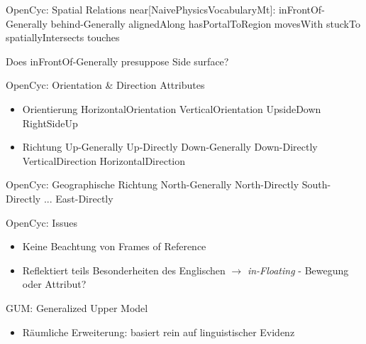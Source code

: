 \documentclass[12pt,a4paper]{beamer}
\begin{document}
\begin{frame}{OpenCyc: Spatial Relations}
near[NaivePhysicsVocabularyMt]:
inFrontOf-Generally
behind-Generally
alignedAlong
hasPortalToRegion
movesWith
stuckTo
spatiallyIntersects
touches

\end{frame}

Does inFrontOf-Generally presuppose Side surface?


\begin{frame}{OpenCyc: Orientation \& Direction Attributes}
\begin{itemize}
\item Orientierung
HorizontalOrientation
VerticalOrientation
UpsideDown
RightSideUp

\item Richtung
Up-Generally
Up-Directly
Down-Generally
Down-Directly
VerticalDirection
HorizontalDirection


\end{itemize}
\end{frame}



\begin{frame}{OpenCyc: Geographische Richtung}
North-Generally
North-Directly
South-Directly
...
East-Directly
\end{frame}


\begin{frame}{OpenCyc: Issues}
\begin{itemize}
\item Keine Beachtung von Frames of Reference
\item Reflektiert teils Besonderheiten des Englischen
$\to$ \textit{in-Floating} - Bewegung oder Attribut?
\end{itemize}
\end{frame}



\begin{frame}{GUM: Generalized Upper Model}
\begin{itemize}
\item Räumliche Erweiterung: basiert rein auf linguistischer Evidenz
\end{itemize}
\end{frame}
\end{document}

